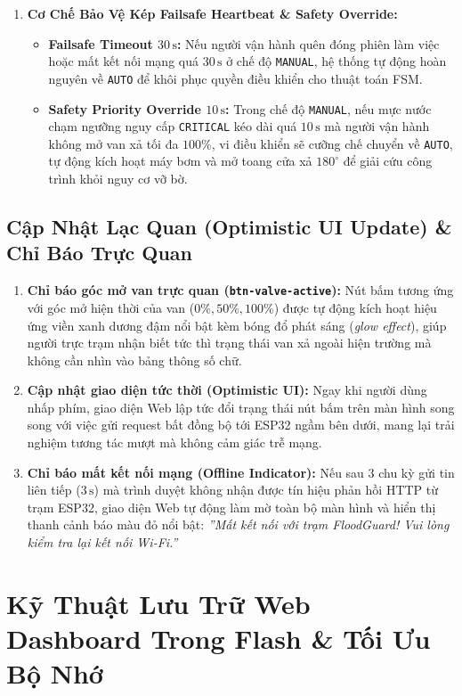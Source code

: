 \begin{enumerate}
    \item \textbf{Cơ Chế Bảo Vệ Kép Failsafe Heartbeat \& Safety Override:}
    \begin{itemize}
        \item \textbf{Failsafe Timeout $30\,\text{s}$:} Nếu người vận hành quên đóng phiên làm việc hoặc mất kết nối mạng quá $30\,\text{s}$ ở chế độ \texttt{MANUAL}, hệ thống tự động hoàn nguyên về \texttt{AUTO} để khôi phục quyền điều khiển cho thuật toán FSM.
        \item \textbf{Safety Priority Override $10\,\text{s}$:} Trong chế độ \texttt{MANUAL}, nếu mực nước chạm ngưỡng nguy cấp \texttt{CRITICAL} kéo dài quá $10\,\text{s}$ mà người vận hành không mở van xả tối đa $100\%$, vi điều khiển sẽ cưỡng chế chuyển về \texttt{AUTO}, tự động kích hoạt máy bơm và mở toang cửa xả $180^\circ$ để giải cứu công trình khỏi nguy cơ vỡ bờ.
    \end{itemize}
\end{enumerate}

\subsection{Cập Nhật Lạc Quan (Optimistic UI Update) \& Chỉ Báo Trực Quan}
\begin{enumerate}
    \item \textbf{Chỉ báo góc mở van trực quan (\texttt{btn-valve-active}):} Nút bấm tương ứng với góc mở hiện thời của van ($0\%, 50\%, 100\%$) được tự động kích hoạt hiệu ứng viền xanh dương đậm nổi bật kèm bóng đổ phát sáng (\textit{glow effect}), giúp người trực trạm nhận biết tức thì trạng thái van xả ngoài hiện trường mà không cần nhìn vào bảng thông số chữ.
    \item \textbf{Cập nhật giao diện tức thời (Optimistic UI):} Ngay khi người dùng nhấp phím, giao diện Web lập tức đổi trạng thái nút bấm trên màn hình song song với việc gửi request bất đồng bộ tới ESP32 ngầm bên dưới, mang lại trải nghiệm tương tác mượt mà không cảm giác trễ mạng.
    \item \textbf{Chỉ báo mất kết nối mạng (Offline Indicator):} Nếu sau 3 chu kỳ gửi tin liên tiếp ($3\,\text{s}$) mà trình duyệt không nhận được tín hiệu phản hồi HTTP từ trạm ESP32, giao diện Web tự động làm mờ toàn bộ màn hình và hiển thị thanh cảnh báo màu đỏ nổi bật: \textit{''Mất kết nối với trạm FloodGuard! Vui lòng kiểm tra lại kết nối Wi-Fi.''}
\end{enumerate}

\section{Kỹ Thuật Lưu Trữ Web Dashboard Trong Flash \& Tối Ưu Bộ Nhớ}

